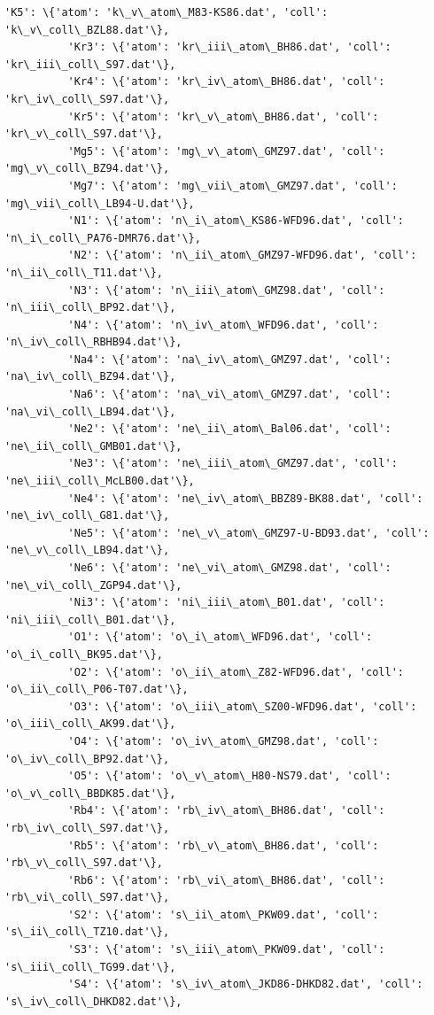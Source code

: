 \documentclass[11pt]{article}
\begin{document}
\begin{Verbatim}[commandchars=\\\{\}]
          'K5': \{'atom': 'k\_v\_atom\_M83-KS86.dat', 'coll': 'k\_v\_coll\_BZL88.dat'\},
          'Kr3': \{'atom': 'kr\_iii\_atom\_BH86.dat', 'coll': 'kr\_iii\_coll\_S97.dat'\},
          'Kr4': \{'atom': 'kr\_iv\_atom\_BH86.dat', 'coll': 'kr\_iv\_coll\_S97.dat'\},
          'Kr5': \{'atom': 'kr\_v\_atom\_BH86.dat', 'coll': 'kr\_v\_coll\_S97.dat'\},
          'Mg5': \{'atom': 'mg\_v\_atom\_GMZ97.dat', 'coll': 'mg\_v\_coll\_BZ94.dat'\},
          'Mg7': \{'atom': 'mg\_vii\_atom\_GMZ97.dat', 'coll': 'mg\_vii\_coll\_LB94-U.dat'\},
          'N1': \{'atom': 'n\_i\_atom\_KS86-WFD96.dat', 'coll': 'n\_i\_coll\_PA76-DMR76.dat'\},
          'N2': \{'atom': 'n\_ii\_atom\_GMZ97-WFD96.dat', 'coll': 'n\_ii\_coll\_T11.dat'\},
          'N3': \{'atom': 'n\_iii\_atom\_GMZ98.dat', 'coll': 'n\_iii\_coll\_BP92.dat'\},
          'N4': \{'atom': 'n\_iv\_atom\_WFD96.dat', 'coll': 'n\_iv\_coll\_RBHB94.dat'\},
          'Na4': \{'atom': 'na\_iv\_atom\_GMZ97.dat', 'coll': 'na\_iv\_coll\_BZ94.dat'\},
          'Na6': \{'atom': 'na\_vi\_atom\_GMZ97.dat', 'coll': 'na\_vi\_coll\_LB94.dat'\},
          'Ne2': \{'atom': 'ne\_ii\_atom\_Bal06.dat', 'coll': 'ne\_ii\_coll\_GMB01.dat'\},
          'Ne3': \{'atom': 'ne\_iii\_atom\_GMZ97.dat', 'coll': 'ne\_iii\_coll\_McLB00.dat'\},
          'Ne4': \{'atom': 'ne\_iv\_atom\_BBZ89-BK88.dat', 'coll': 'ne\_iv\_coll\_G81.dat'\},
          'Ne5': \{'atom': 'ne\_v\_atom\_GMZ97-U-BD93.dat', 'coll': 'ne\_v\_coll\_LB94.dat'\},
          'Ne6': \{'atom': 'ne\_vi\_atom\_GMZ98.dat', 'coll': 'ne\_vi\_coll\_ZGP94.dat'\},
          'Ni3': \{'atom': 'ni\_iii\_atom\_B01.dat', 'coll': 'ni\_iii\_coll\_B01.dat'\},
          'O1': \{'atom': 'o\_i\_atom\_WFD96.dat', 'coll': 'o\_i\_coll\_BK95.dat'\},
          'O2': \{'atom': 'o\_ii\_atom\_Z82-WFD96.dat', 'coll': 'o\_ii\_coll\_P06-T07.dat'\},
          'O3': \{'atom': 'o\_iii\_atom\_SZ00-WFD96.dat', 'coll': 'o\_iii\_coll\_AK99.dat'\},
          'O4': \{'atom': 'o\_iv\_atom\_GMZ98.dat', 'coll': 'o\_iv\_coll\_BP92.dat'\},
          'O5': \{'atom': 'o\_v\_atom\_H80-NS79.dat', 'coll': 'o\_v\_coll\_BBDK85.dat'\},
          'Rb4': \{'atom': 'rb\_iv\_atom\_BH86.dat', 'coll': 'rb\_iv\_coll\_S97.dat'\},
          'Rb5': \{'atom': 'rb\_v\_atom\_BH86.dat', 'coll': 'rb\_v\_coll\_S97.dat'\},
          'Rb6': \{'atom': 'rb\_vi\_atom\_BH86.dat', 'coll': 'rb\_vi\_coll\_S97.dat'\},
          'S2': \{'atom': 's\_ii\_atom\_PKW09.dat', 'coll': 's\_ii\_coll\_TZ10.dat'\},
          'S3': \{'atom': 's\_iii\_atom\_PKW09.dat', 'coll': 's\_iii\_coll\_TG99.dat'\},
          'S4': \{'atom': 's\_iv\_atom\_JKD86-DHKD82.dat', 'coll': 's\_iv\_coll\_DHKD82.dat'\},

\end{Verbatim}
\end{document}
